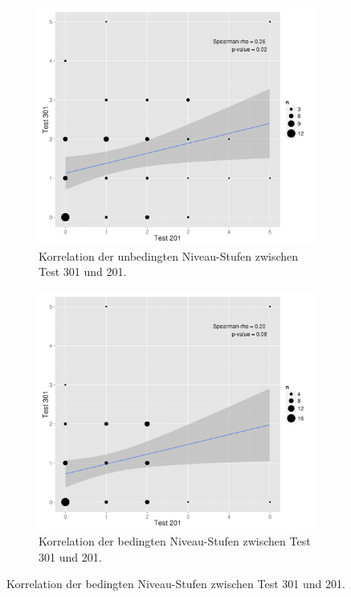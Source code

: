\begin{figure}[htbp]
\centering
\begin{subfigure}{0.49\textwidth}
  \includegraphics[width=1.0\linewidth]{graphics/cor201301u.png}
  \caption{Korrelation der unbedingten Niveau-Stufen zwischen Test 301 und 201.}
  \label{fig:cor201301k}
\end{subfigure}
\begin{subfigure}{0.49\textwidth}
  \includegraphics[width=1.0\linewidth]{graphics/cor201301k.png}
  \caption{Korrelation der bedingten Niveau-Stufen zwischen Test 301 und 201.}
  \label{fig:cor201301u}
\end{subfigure}
\end{figure}
